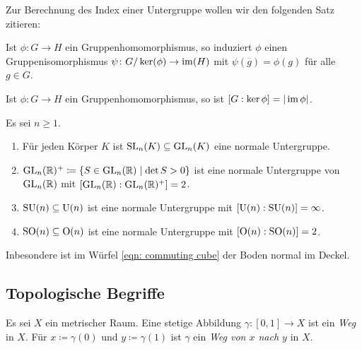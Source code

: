 Zur Berechnung des Index einer Untergruppe wollen wir den folgenden Satz zitieren:


\begin{theorem}[1.\ Isomorphiesatz]
  Ist $\phi \colon G \to H$ ein Gruppenhomomorphismus, so induziert $\phi$ einen Gruppenisomorphismus $\psi \colon G/\ker(\phi) \to \operatorname{im}(H)$ mit $\psi(\overline{g}) = \phi(g)$ für alle $g \in G$.
\end{theorem}


\begin{corollary}
  Ist $\phi \colon G \to H$ ein Gruppenhomomorphismus, so ist $[G : \ker \phi] = |\operatorname{im} \phi|$.
\end{corollary}


\begin{proposition}
  Es sei $n \geq 1$.
  \begin{enumerate}[leftmargin=*, label=\roman*)]
    \item
      Für jeden Körper $K$ ist $\mathrm{SL}_n(K) \subseteq \mathrm{GL}_n(K)$ eine normale Untergruppe.
    \item
      $\mathrm{GL}_n(\mathbb{R})^+ \coloneqq \{S \in \mathrm{GL}_n(\mathbb{R}) \mid \det S > 0\}$ ist eine normale Untergruppe von $\mathrm{GL}_n(\mathbb{R})$ mit $[\mathrm{GL}_n(\mathbb{R}) : \mathrm{GL}_n(\mathbb{R})^+] = 2$.
    \item
      $\mathrm{SU}(n) \subseteq \mathrm{U}(n)$ ist eine normale Untergruppe mit $[\mathrm{U}(n) : \mathrm{SU}(n)] = \infty$.
    \item
      $\mathrm{SO}(n) \subseteq \mathrm{O}(n)$ ist eine normale Untergruppe mit $[\mathrm{O}(n) : \mathrm{SO}(n)] = 2$.
  \end{enumerate}
  Inbesondere ist im Würfel \eqref{eqn: commuting cube} der Boden normal im Deckel.
\end{proposition}














\subsection{Topologische Begriffe}


\begin{definition}
  Es sei $X$ ein metrischer Raum.
  Eine stetige Abbildung $\gamma \colon [0,1] \to X$ ist ein \emph{Weg} in $X$.
  Für $x \coloneqq \gamma(0)$ und $y \coloneqq \gamma(1)$ ist $\gamma$ ein \emph{Weg von $x$ nach $y$} in $X$.
\end{definition}


